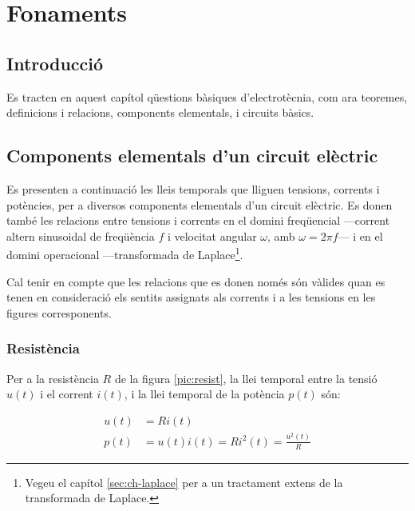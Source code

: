 \chapter{Fonaments}\label{ch:fonaments}

\section{Introducció}
Es tracten en aquest capítol qüestions bàsiques
d'electrotècnia, com ara teoremes, definicions i relacions, components elementals, i circuits bàsics.

\section{Components elementals d'un circuit elèctric}\label{sec:comp_elem}

Es presenten a continuació les lleis temporals que lliguen tensions,
corrents i potències, per a diversos components elementals d'un
circuit elèctric. Es donen també les relacions entre tensions i
corrents en el domini freqüencial ---corrent altern sinusoidal de freqüència $f$ i velocitat angular $\omega$, amb
$\omega=2\pi f$--- i en el domini operacional ---transformada de
Laplace\footnote{Vegeu el capítol \ref{sec:ch-laplace} per a un tractament extens de la transformada de Laplace.}.

Cal tenir en compte que les relacions que es donen només són
vàlides  quan es tenen en consideració els sentits assignats als
corrents i a les tensions en les figures corresponents.

\subsection{Resistència} 

Per a la resistència $R$ de la figura
\vref{pic:resist}, la llei temporal entre la tensió $u(t)$ i el
corrent $i(t)$, i la llei temporal de la potència $p(t)$ són:


\hfill
\begin{minipage}[b]{5cm}
	
	\label{pic:resist}
\end{minipage}
\hfill
\begin{minipage}[b][3.25cm][t]{8cm}
	\begin{align}
		u(t) &= R i(t) \\  p(t) &= u(t) i(t) = R i^2(t) = \frac{u^2(t)}{R}
	\end{align}
\end{minipage}

